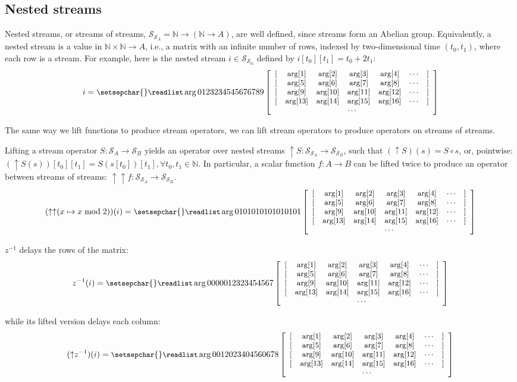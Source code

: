 \documentclass[twocolumn
]{svjour3}
\numberwithin{equation}{section}
\newcommand{\N}{\mathbb{N}}  %
\newcommand{\stream}[1]{\ensuremath{\mathcal{S}_{#1}}}
\newcommand{\zm}{\ensuremath{z^{-1}}} %
\newcommand{\lift}[1]{{\uparrow}#1}
\begin{document}
\subsection{Nested streams}

\newcommand{\ssa}[1]{
  \small
\setsepchar{ }
\readlist\arg{#1}
\begin{bmatrix}
   \begin{array}{ccccccc}
        {[} & \arg[1] & \arg[2] & \arg[3] & \arg[4] & \cdots & {]} \\
        {[} & \arg[5] & \arg[6] & \arg[7] & \arg[8] & \cdots & {]} \\
        {[} & \arg[9] & \arg[10] & \arg[11] & \arg[12] & \cdots & {]} \\
        {[} & \arg[13] & \arg[14] & \arg[15] & \arg[16] & \cdots & {]} \\
        \multicolumn{7}{c}{\cdots}
   \end{array}
\end{bmatrix}
}

Nested streams, or streams of streams, $\stream{\stream{A}} = \N
\rightarrow (\N \rightarrow A)$, are well defined, since streams form
an Abelian group.  Equivalently, a nested stream is a value in $\N
\times \N \to A$, i.e., a matrix with an infinite number of rows,
indexed by two-dimensional time $(t_0, t_1)$, where each row is a
stream.  For example, here is the nested stream $i \in
\stream{\stream{\N}}$ defined by $i[t_0][t_1] = t_0 + 2 t_1$:
$$ i = \ssa{0 1 2 3 2 3 4 5 4 5 6 7 6 7 8 9} $$

The same way we lift functions to produce stream operators, we can
lift stream operators to produce operators on streams of streams.

Lifting a stream operator $S: \stream{A} \to \stream{B}$ yields an operator over
nested streams $\lift{S}: \stream{\stream{A}} \to \stream{\stream{B}}$, such
that $(\lift{S})(s) = S \circ s$, or, pointwise: $(\lift{S}(s))[t_0][t_1] =
S(s[t_0])[t_1], \forall t_0, t_1 \in \N$.  In particular, a scalar function $f:
A \rightarrow B$ can be lifted twice to produce an operator between streams of
streams: $\lift{\lift{f}}: \stream{\stream{A}} \rightarrow \stream{\stream{B}}$.
$$(\lift{\lift{(x \mapsto x \bmod 2)}})(i) =
  \ssa{0 1 0 1 0 1 0 1 0 1 0 1 0 1 0 1}$$

$\zm$ delays the rows of the matrix:
$$\zm(i) = \ssa{0 0 0 0 0 1 2 3 2 3 4 5 4 5 6 7}$$

\noindent while its lifted version delays each column:
$$(\lift{\zm})(i) = \ssa{0 0 1 2 0 2 3 4 0 4 5 6 0 6 7 8}$$
\end{document}
